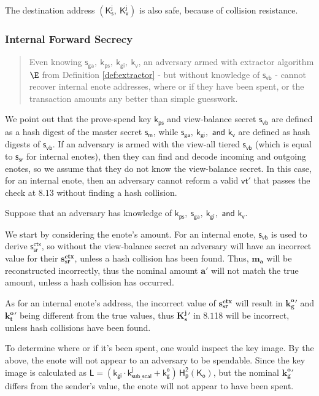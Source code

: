 \documentclass{article}
\theoremstyle{definition}
\newcommand{\6}{\mathbf}
\newcommand{\7}{\mathcal}
\renewcommand{\line}[1]{{\text{Section }$8.1$\text{, line }#1}}
\renewcommand{\sf}[1]{{\mathsf{#1}}}
\newcommand{\sfb}[1]{{\mathsf{\mathbf{#1}}}}
\begin{document}
The destination address $(\sf{K_s^j}, \ \sf{K_v^j})$ is also safe, because of collision resistance.
\medskip






\subsubsection{Internal Forward Secrecy} 

\begin{quote}
        Even knowing $\sf{s_{ga}, \ k_{ps}, \ k_{gi}, \ k_{v}}$, an adversary armed with extractor algorithm $\E$ from Definition \ref{def:extractor} - but without knowledge of $\sf{s_{vb}}$ - cannot recover internal enote addresses, where or if they have been spent, or the transaction amounts any better than simple guesswork.
\end{quote}

We point out that the prove-spend key $\sf{k_{ps}}$ and view-balance secret $\sf{s_{vb}}$ are defined as a hash digest of the master secret $\sf{s_m}$, while $\sf{s_{ga}, \ k_{gi}, \text{ and } k_{v}}$ are defined as hash digests of $\sf{s_{vb}}$. If an adversary is armed with the view-all tiered $\sf{s_{vb}}$ (which is equal to $\sf{s_{sr}}$ for internal enotes), then they can find and decode incoming and outgoing enotes, so we assume that they do not know the view-balance secret. In this case, for an internal enote, then an adversary cannot reform a valid $\sf{vt}'$ that passes the check at \line{3} without finding a hash collision.
\medskip 

Suppose that an adversary has knowledge of $\sf{k_{ps}}, \ \sf{s_{ga}, \ k_{gi}, \text{ and } k_{v}}$. 
\medskip 

We start by considering the enote's 
amount. For an internal enote, $\sf{s_{vb}}$ is used to derive $\sf{s_{sr}^{ctx}}$, so without the view-balance secret an adversary will have an incorrect value for their $\sfb{s_{sr}^{ctx}}$, unless a hash collision has been found.
Thus, $\sfb{m_a}$ will be reconstructed incorrectly, thus the nominal amount $\sfb{a}'$ will not match the true amount, unless a hash collision has occurred. 
\medskip 

As for an internal enote's address, the incorrect value of $\sfb{s_{sr}^{ctx}}$ will result in $\sfb{k_g^o}'$ and $\sfb{k_t^o}'$ being different from the true values, thus $\sfb{K_s^j}'$ in \line{18} will be incorrect, unless hash collisions have been found.
\medskip 

To determine where or if it's been spent, one would inspect the key image. By the above, the enote will not appear to an adversary to be spendable. Since the key image is calculated as $\sf{L = (k_{gi} \cdot k_{sub\_scal}^j + k_g^o) \, H_p^2(K_o)}$, but the nominal $\sfb{k_g^o}'$ differs from the sender's value, the enote will not appear to have been spent.
\end{document}
